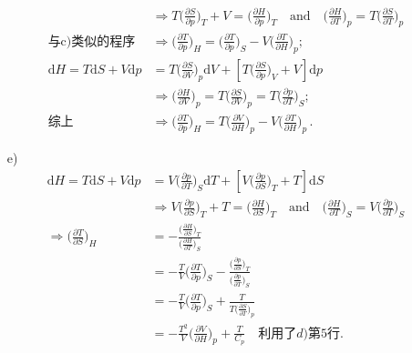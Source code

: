 \documentclass[letterpaper, 10pt]{article}
\newcommand{\dd}{\mathrm{d}}
\begin{document}
\begin{itemize}
\begin{align*}
	& \Rightarrow T \bigg( \frac{\partial S}{\partial p} \bigg)_{T} + V = \bigg( \frac{\partial H}{\partial p} \bigg)_{T} \quad{} \text{and} \quad{}
	\bigg( \frac{\partial H}{\partial T} \bigg)_{p} = T \bigg( \frac{\partial S}{\partial T} \bigg)_{p} \\
	\text{与c)类似的程序} & \Rightarrow \bigg( \frac{\partial T}{\partial p} \bigg)_{H} 
	= \bigg( \frac{\partial T}{\partial p} \bigg)_{S} - V \bigg( \frac{\partial T}{\partial H} \bigg)_{p}; \\
	\dd H = T \dd S + V \dd p & = T \bigg( \frac{\partial S}{\partial V} \bigg)_{p} \dd V + \left[ T \bigg( \frac{\partial S}{\partial p} \bigg)_{V} + V \right] \dd p \\
	& \Rightarrow \bigg( \frac{\partial H}{\partial V} \bigg)_{p} = T \bigg( \frac{\partial S}{\partial V} \bigg)_{p} = T \bigg( \frac{\partial p}{\partial T} \bigg)_{S}; \\
	\text{综上} & \Rightarrow \bigg( \frac{\partial T}{\partial p} \bigg)_{H} 
	= T \bigg( \frac{\partial V}{\partial H} \bigg)_{p} - V \bigg( \frac{\partial T}{\partial H} \bigg)_{p} \,.
	\end{align*}
	\item[e)]
	\begin{align*}
	\dd H = T \dd S + V \dd p & = V \bigg( \frac{\partial p}{\partial T} \bigg)_{S} \dd T + \left[ V \bigg( \frac{\partial p}{\partial S} \bigg)_{T} + T \right] \dd S \\
	& \Rightarrow V \bigg( \frac{\partial p}{\partial S} \bigg)_{T} + T = \bigg( \frac{\partial H}{\partial S} \bigg)_{T} \quad{} \text{and} \quad{}
	\bigg( \frac{\partial H}{\partial T} \bigg)_{S} = V \bigg( \frac{\partial p}{\partial T} \bigg)_{S} \\
	\Rightarrow \bigg( \frac{\partial T}{\partial S} \bigg)_{H} 
	& = - \frac{ \big( \frac{\partial H}{\partial S} \big)_{T} }{ \big( \frac{\partial H}{\partial T} \big)_{S} } \\
	& = - \frac{T}{V} \bigg( \frac{\partial T}{\partial p} \bigg)_{S} - \frac{ \big( \frac{\partial p}{\partial S} \big)_{T} }{ \big( \frac{\partial p}{\partial T} \big)_{S} } \\
	& = - \frac{T}{V} \bigg( \frac{\partial T}{\partial p} \bigg)_{S} + \frac{T}{T \big( \frac{\partial S}{\partial T} \big)_{p} } \\
	& = - \frac{T^2}{V} \bigg( \frac{\partial V}{\partial H} \bigg)_{p} + \frac{T}{C_{p}} \quad{} \text{利用了$d)$第$5$行.}
	\end{align*}
\end{itemize}
\end{document}
